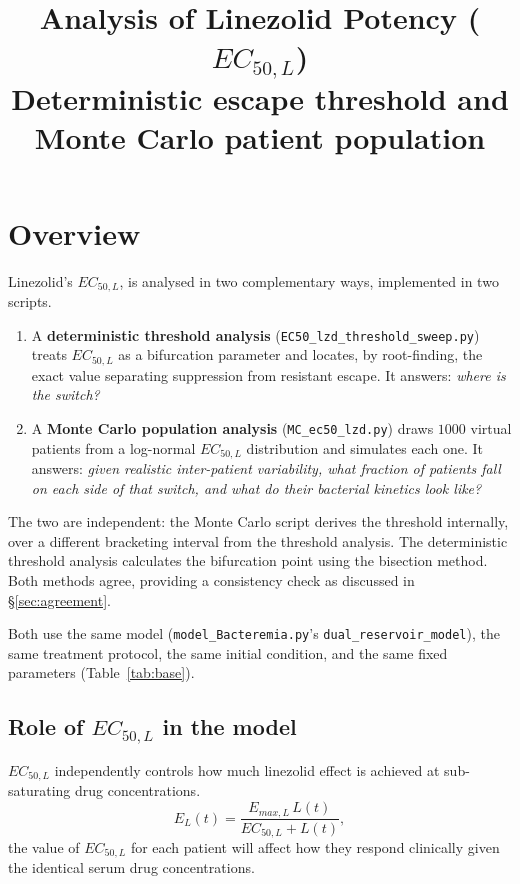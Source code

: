 \documentclass[11pt]{article}
\title{Analysis of Linezolid Potency ($EC_{50,L}$)\\
\large Deterministic escape threshold and Monte Carlo patient population}
\author{}
\date{}
\begin{document}
\maketitle

\section{Overview}

Linezolid's  $EC_{50,L}$, is analysed
in two complementary ways, implemented in two scripts.

\begin{enumerate}
\item A \textbf{deterministic threshold analysis}
(\texttt{EC50\_lzd\_threshold\_sweep.py}) treats $EC_{50,L}$ as a
bifurcation parameter and locates, by root-finding, the exact value
separating suppression from resistant escape. It answers: \emph{where is
the switch?}
\item A \textbf{Monte Carlo population analysis}
(\texttt{MC\_ec50\_lzd.py}) draws $1000$ virtual patients from a log-normal
$EC_{50,L}$ distribution and simulates each one. It answers: \emph{given
realistic inter-patient variability, what fraction of patients fall on
each side of that switch, and what do their bacterial kinetics look
like?}
\end{enumerate}

The two are independent: the Monte Carlo script derives the threshold
internally, over a different bracketing interval from the threshold analysis. The deterministic threshold analysis calculates the bifurcation point using the bisection method.  Both methods agree, providing a consistency check as discussed in \S\ref{sec:agreement}.

Both use the same model (\texttt{model\_Bacteremia.py}'s
\texttt{dual\_reservoir\_model}), the same treatment protocol, the same
initial condition, and the same fixed parameters (Table~\ref{tab:base}).

\subsection{Role of $EC_{50,L}$ in the model}

$EC_{50,L}$ independently controls how much linezolid effect is achieved at sub-saturating drug concentrations.
\begin{equation}
E_L(t) = \frac{E_{max,L}\, L(t)}{EC_{50,L} + L(t)},
\label{eq:hill}
\end{equation}
the value of $EC_{50,L}$ for each patient will affect how they respond clinically given the identical serum drug concentrations.
\end{document}
